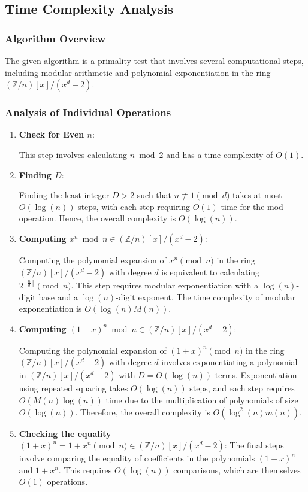 \documentclass{article}
\theoremstyle{plain}
\theoremstyle{definition}
\newcommand{\floor}[1]{\left\lfloor #1 \right\rfloor}
\newcommand{\Z}{\mathbb{Z}}
\newcommand{\Zn}{\Z/n}
\newcommand{\Mx}{(\Zn)[x]/(x^d-2)}
\begin{document}
\subsection{Time Complexity Analysis} \label{subsection:timecomplexity}

\subsubsection{Algorithm Overview}
The given algorithm is a primality test that involves several computational steps, including modular arithmetic and polynomial exponentiation in the ring $\Mx$.

\subsubsection{Analysis of Individual Operations}
\begin{enumerate}
    \item \textbf{Check for Even \( n \)}:
    
        This step involves calculating $n \bmod{2}$ and has a time complexity of \( O(1) \).

    \item \textbf{Finding \( D \)}:
    
        Finding the least integer \( D > 2 \) such that $n \not\equiv 1 \pmod{d}$ takes at most \( O(\log(n)) \) steps, with each step requiring \( O(1) \) time for the mod operation. Hence, the overall complexity is \( O(\log(n)) \).

    \item \textbf{Computing \( x^n \bmod{n} \in \Mx \)}:
    
        Computing the polynomial expansion of $x^n \pmod{n}$ in the ring \( \Mx \) with degree $d$ is equivalent to calculating $2^{\floor{\frac{n}{d}}} \pmod{n}$. This step requires modular exponentiation with a \( \log(n) \)-digit base and a \( \log(n) \)-digit exponent. The time complexity of modular exponentiation is \( O(\log(n) M(n)) \).

    \item \textbf{Computing \( (1+x)^n \bmod{n} \in \Mx \)}:
    
        Computing the polynomial expansion of \( (1+x)^n \pmod{n} \) in the ring \( (\Zn)[x]/(x^d-2) \)  with degree $d$ involves exponentiating a polynomial in $(\Zn)[x]/(x^d-2)$ with \( D = O(\log(n)) \) terms. Exponentiation using repeated squaring takes \( O(\log(n)) \) steps, and each step requires \( O(M(n)\log(n)) \) time due to the multiplication of polynomials of size \( O(\log(n)) \). Therefore, the overall complexity is \( O(\log^2(n) m(n)) \).
         
    \item \textbf{Checking the equality \( (1+x)^n = 1 + x^n \pmod{n} \in (\Zn)[x]/(x^d-2) \)}:
        The final steps involve comparing the equality of coefficients in the polynomials $(1+x)^n$ and $1 + x^n$. This requires $O(\log(n))$ comparisons, which are themselves \( O(1) \) operations.
\end{enumerate}
\end{document}
